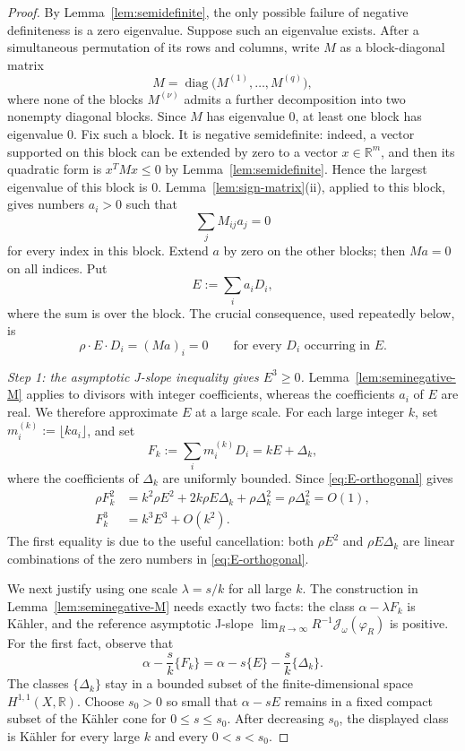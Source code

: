 \documentclass[reqno]{amsart}
\theoremstyle{remark}
\def\R{\mathbb{R}}
\def\cJ{{\mathcal J}}
\theoremstyle{plain}
\begin{document}
\begin{proof}
By Lemma~\ref{lem:semidefinite}, the only possible failure of negative
definiteness is a zero eigenvalue.  Suppose such an eigenvalue exists. After a simultaneous permutation of its rows and columns, write $M$
as a block-diagonal matrix
\[
 M=\operatorname{diag}\bigl(M^{(1)},\ldots,M^{(q)}\bigr),
\]
where none of the blocks $M^{(\nu)}$ admits a further decomposition
into two nonempty diagonal blocks.   Since $M$ has eigenvalue $0$, at least one block has
eigenvalue $0$.  Fix such a block.  It is negative semidefinite:
indeed, a vector supported on this block can be extended by zero to a
vector $x\in\R^m$, and then its quadratic form is $x^TMx\leq0$ by
Lemma~\ref{lem:semidefinite}.  Hence the largest eigenvalue of this
block is $0$.
Lemma~\ref{lem:sign-matrix}(ii), applied to this block, gives numbers
$a_i>0$ such that
\[
 \sum_jM_{ij}a_j=0
\]
for every index in this block.  Extend $a$ by zero on the other blocks;
then $Ma=0$ on all indices.  Put
\[
 E:=\sum_i a_iD_i,
\]
where the sum is over the block.
The crucial consequence, used repeatedly below, is
\begin{equation}\label{eq:E-orthogonal}
 \rho\cdot E\cdot D_i=(Ma)_i=0
 \qquad\text{for every }D_i\text{ occurring in }E.
\end{equation}

\smallskip
\noindent\emph{Step 1: the asymptotic J-slope inequality gives
$E^3\geq0$.}
Lemma~\ref{lem:seminegative-M} applies to divisors with integer coefficients,
whereas the coefficients $a_i$ of $E$ are real.  We therefore
approximate $E$ at a large scale.  For each large integer $k$, set  $m_i^{(k)}:=\lfloor ka_i\rfloor$, and set
\[
 F_k:=\sum_i m_i^{(k)}D_i=kE+\Delta_k,
\]
where the coefficients of $\Delta_k$ are uniformly bounded.  Since
\eqref{eq:E-orthogonal} gives
\begin{equation}\label{eq:rounded-asymptotics}
\begin{aligned}
 \rho F_k^2
 &=k^2\rho E^2+2k\rho E\Delta_k+\rho\Delta_k^2
   =\rho\Delta_k^2=O(1),\\
 F_k^3&=k^3E^3+O(k^2).
\end{aligned}
\end{equation}
The first equality is due to the useful cancellation: both $\rho E^2$ and
$\rho E\Delta_k$ are linear combinations of the zero numbers in
\eqref{eq:E-orthogonal}.

We next justify using one scale $\lambda=s/k$ for all large $k$.
The construction in Lemma~\ref{lem:seminegative-M} needs exactly two
facts: the class $\alpha-\lambda F_k$ is K\"ahler, and the
reference asymptotic J-slope $\lim_{R\to\infty}R^{-1}\cJ_{\omega}(\varphi_R)$ is positive.
For the first fact, observe that
\[
 \alpha-\frac{s}{k}\{F_k\}
 =\alpha-s\{E\}-\frac{s}{k}\{\Delta_k\}.
\]
The classes $\{\Delta_k\}$ stay in a bounded subset of the
finite-dimensional space $H^{1,1}(X,\R)$.  Choose $s_0>0$ so small
that $\alpha-sE$ remains in a fixed compact subset of the K\"ahler
cone for $0\leq s\leq s_0$.  After decreasing $s_0$, the displayed
class is K\"ahler for every large $k$ and every $0<s<s_0$.


\end{proof}
\end{document}
